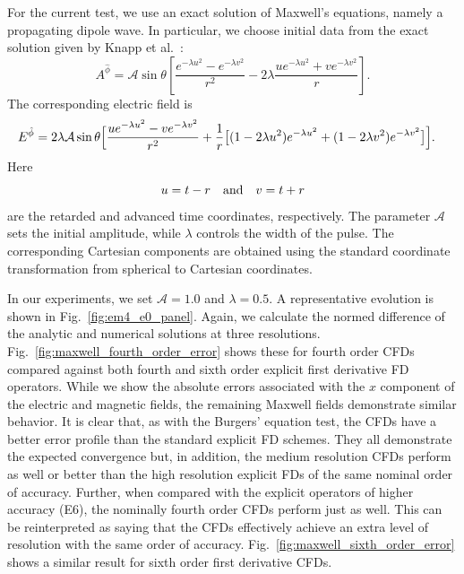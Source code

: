 For the current test, we use an exact solution of Maxwell's equations, namely a propagating dipole wave. In
particular, we choose initial data from the exact solution given by Knapp
et al.~\cite{Knapp:2002fm}:
\begin{equation}
\label{eq:maxwell_dipole_potential}
A^{\hat{\phi}}
=
\mathcal{A}\sin\theta
\left[
\frac{e^{-\lambda u^2}-e^{-\lambda v^2}}{r^2}
-
2\lambda
\frac{u e^{-\lambda u^2}+ v e^{-\lambda v^2}}{r}
\right].
\end{equation}
The corresponding electric field is 
\begin{equation}
\label{eq:maxwell_dipole_electric_field}
\begin{aligned}
E^{\hat{\phi}}
&=
2\lambda\mathcal{A}\sin\theta
\Bigl[
\frac{
    u e^{-\lambda u^2}
    -
    v e^{-\lambda v^2}
}{r^2}
+
\frac{1}{r}
\bigl[
    (1-2\lambda u^2)e^{-\lambda u^2}
    +
    (1-2\lambda v^2)e^{-\lambda v^2}
\bigr]
\Bigr].
\end{aligned}
\end{equation}
Here
\begin{equation}
u = t-r
\quad {\rm and} \quad 
v = t+r
\end{equation}
are the retarded and advanced time coordinates, respectively.
The parameter $\mathcal{A}$ sets the initial amplitude, while $\lambda$
controls the width of the pulse. The corresponding Cartesian components are
obtained using the standard coordinate transformation from spherical to
Cartesian coordinates.

In our experiments, we set $\mathcal{A}=1.0$ and $\lambda=0.5$. A representative evolution is shown in Fig.~\ref{fig:em4_e0_panel}.  Again, we calculate the normed difference of the analytic and numerical solutions at three resolutions.  Fig.~\ref{fig:maxwell_fourth_order_error} shows these for fourth order CFDs compared against both fourth and sixth order explicit first derivative FD operators.  While we show the absolute errors associated with the $x$ component of the electric and magnetic fields, the remaining Maxwell fields demonstrate similar behavior.  It is clear that, as with the Burgers' equation test, the CFDs have a better error profile than the standard explicit FD schemes.  They all demonstrate the expected convergence but, in addition, the medium resolution CFDs perform as well or better than the high resolution explicit FDs of the same nominal order of accuracy.  Further, when compared with the explicit operators of higher accuracy (E6), the nominally fourth order CFDs perform just as well.  This can be reinterpreted as saying that the CFDs effectively achieve an extra level of resolution with the same order of accuracy.  Fig.~\ref{fig:maxwell_sixth_order_error} shows a similar result for sixth order first derivative CFDs.  

